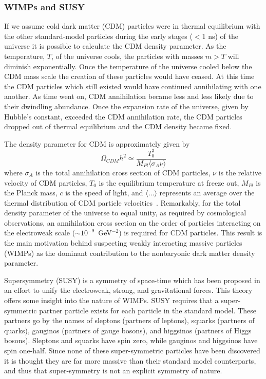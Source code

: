 \subsubsection{WIMPs and SUSY} \label{WIMPSandSUSY}

If we assume cold dark matter (CDM) particles were in thermal equilibrium with the other standard-model particles during the early stages ($<$1 ns) of the universe it is possible to calculate the CDM density parameter.  As the temperature, $T$, of the universe cools, the particles with masses $m > T$ will diminish exponentially.  Once the temperature of the universe cooled below the CDM mass scale the creation of these particles would have ceased.  At this time the CDM particles which still existed would have continued annihilating with one another.  As time went on, CDM annihilation became less and less likely due to their dwindling abundance.  Once the expansion rate of the universe, given by Hubble's constant, exceeded the CDM annihilation rate, the CDM particles dropped out of thermal equilibrium and the CDM density became fixed.  

The density parameter for CDM is approximately given by
\[\Omega_{CDM} h^2 \simeq \frac{T_0^3}{M_{Pl} \langle \sigma_A \nu \rangle} \]
where $\sigma_A$ is the total annihilation cross section of CDM particles, $\nu$ is the relative velocity of CDM particles, $T_0$ is the equilibrium temperature at freeze out, $M_{Pl}$ is the Planck mass, $c$ is the speed of light, and $\langle ... \rangle$ represents an average over the thermal distribution of CDM particle velocities~\cite{Kolb,Jungman}. Remarkably, for the total density parameter of the universe to equal unity, as required by cosmological observations, an annihilation cross section on the order of particles interacting on the electroweak scale ($\sim 10^{-9}$~GeV$^{-2}$) is required for CDM particles. This result is the main motivation behind suspecting weakly interacting massive particles (WIMPs) as the dominant contribution to the nonbaryonic dark matter density parameter.  

Supersymmetry (SUSY) is a symmetry of space-time which has been proposed in an effort to unify the electroweak, strong, and gravitational forces.  This theory offers some insight into the nature of WIMPs.  SUSY requires that a super-symmetric partner particle exists for each particle in the standard model.  These partners go by the names of sleptons (partners of leptons), squarks (partners of quarks), gauginos (partners of gauge bosons), and higgsinos (partners of Higgs bosons).  Sleptons and squarks have spin zero, while gauginos and higgsinos have spin one-half.  Since none of these super-symmetric particles have been discovered it is thought they are far more massive than their standard model counterparts, and thus that super-symmetry is not an explicit symmetry of nature.
  
